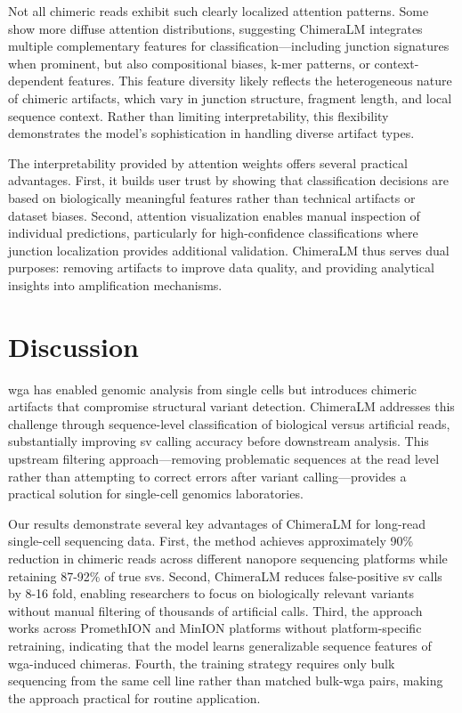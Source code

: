 \documentclass[pdflatex,sn-nature,lineno]{sn-jnl}%
\theoremstyle{thmstyleone}%
\theoremstyle{thmstyletwo}%
\theoremstyle{thmstylethree}%
\begin{document}
Not all chimeric reads exhibit such clearly localized attention patterns. 
Some show more diffuse attention distributions, suggesting ChimeraLM integrates multiple complementary features for classification—including junction signatures when prominent, but also compositional biases, k-mer patterns, or context-dependent features. 
This feature diversity likely reflects the heterogeneous nature of chimeric artifacts, which vary in junction structure, fragment length, and local sequence context. 
Rather than limiting interpretability, this flexibility demonstrates the model's sophistication in handling diverse artifact types.

The interpretability provided by attention weights offers several practical advantages. 
First, it builds user trust by showing that classification decisions are based on biologically meaningful features rather than technical artifacts or dataset biases. 
Second, attention visualization enables manual inspection of individual predictions, particularly for high-confidence classifications where junction localization provides additional validation. 
ChimeraLM thus serves dual purposes: removing artifacts to improve data quality, and providing analytical insights into amplification mechanisms.

\section*{Discussion}\label{sec:discussion}

\gls{wga} has enabled genomic analysis from single cells but introduces chimeric artifacts that compromise structural variant detection. ChimeraLM addresses this challenge through sequence-level classification of biological versus artificial reads, substantially improving \gls{sv} calling accuracy before downstream analysis. This upstream filtering approach—removing problematic sequences at the read level rather than attempting to correct errors after variant calling—provides a practical solution for single-cell genomics laboratories.

Our results demonstrate several key advantages of ChimeraLM for long-read single-cell sequencing data. First, the method achieves approximately 90\% reduction in chimeric reads across different nanopore sequencing platforms while retaining 87-92\% of true \glspl{sv}.
Second, ChimeraLM reduces false-positive \gls{sv} calls by 8-16 fold, enabling researchers to focus on biologically relevant variants without manual filtering of thousands of artificial calls. Third, the approach works across PromethION and MinION platforms without platform-specific retraining, indicating that the model learns generalizable sequence features of \gls{wga}-induced chimeras. Fourth, the training strategy requires only bulk sequencing from the same cell line rather than matched bulk-\gls{wga} pairs, making the approach practical for routine application.
\end{document}
